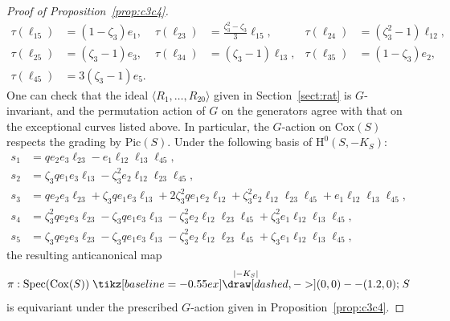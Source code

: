 \documentclass[12pt, reqno]{amsart}
\theoremstyle{plain}
\theoremstyle{remark}
\theoremstyle{definition}
\numberwithin{equation}{section}
\newcommand{\longdashrightarrow}{%
  \mathrel{\tikz[baseline=-0.55ex]
  \draw[dashed,->] (0,0)--(1.2,0);}}
\def\rH{{\mathrm H}}
\def\Pic{\mathrm{Pic}}
\def\Cox{\mathrm{Cox}}
\def\Spec{\mathrm{Spec}}
\begin{document}
\begin{proof}[Proof of Proposition~\ref{prop:c3c4}]
\begin{align*}
\tau(\ell_{15})&=(1-\zeta_3)e_1,&
\tau(\ell_{23})&=\frac{\zeta_3^2-\zeta_3}{3}\ell_{15},&
\tau(\ell_{24})&=(\zeta_3^2-1)\ell_{12},\\
\tau(\ell_{25})&=(\zeta_3-1)e_3,&
\tau(\ell_{34})&=(\zeta_3-1)\ell_{13},&
\tau(\ell_{35})&=(1-\zeta_3)e_2,\\
\tau(\ell_{45})&=3(\zeta_3-1)e_5.
\end{align*}
  One can check that
the ideal $\langle R_1,\ldots,R_{20}\rangle$ given in Section~\ref{sect:rat} is $G$-invariant, and the permutation action of $G$ on the generators agree with that on the exceptional curves listed above. In particular, the $G$-action on $\Cox(S)$ respects the grading by $\Pic(S)$.  Under the following basis of $\rH^0(S,-K_S)$:
\begin{align*}
s_1
&=q e_2e_3\ell_{23}
  -e_1\ell_{12}\ell_{13}\ell_{45},\\
s_2
&=\zeta_3 q e_1e_3\ell_{13}
  -\zeta_3^2 e_2\ell_{12}\ell_{23}\ell_{45},\\
s_3
&=q e_2e_3\ell_{23}
  +\zeta_3 q e_1e_3\ell_{13}
  +2\zeta_3^2 q e_1e_2\ell_{12}
  +\zeta_3^2 e_2\ell_{12}\ell_{23}\ell_{45}
  +e_1\ell_{12}\ell_{13}\ell_{45},\\
s_4
&=\zeta_3^2 q e_2e_3\ell_{23}
  -\zeta_3 q e_1e_3\ell_{13}
  -\zeta_3^2 e_2\ell_{12}\ell_{23}\ell_{45}
  +\zeta_3^2 e_1\ell_{12}\ell_{13}\ell_{45},\\
s_5
&=\zeta_3 q e_2e_3\ell_{23}
  -\zeta_3 q e_1e_3\ell_{13}
  -\zeta_3^2 e_2\ell_{12}\ell_{23}\ell_{45} 
  +\zeta_3 e_1\ell_{12}\ell_{13}\ell_{45},
\end{align*}
the resulting anticanonical map 
$$
\pi:\Spec(\Cox(S))\stackrel{|-K_S|}{\longdashrightarrow} S
$$
is equivariant under the prescribed $G$-action given in Proposition~\ref{prop:c3c4}. 


\end{proof}
\end{document}
